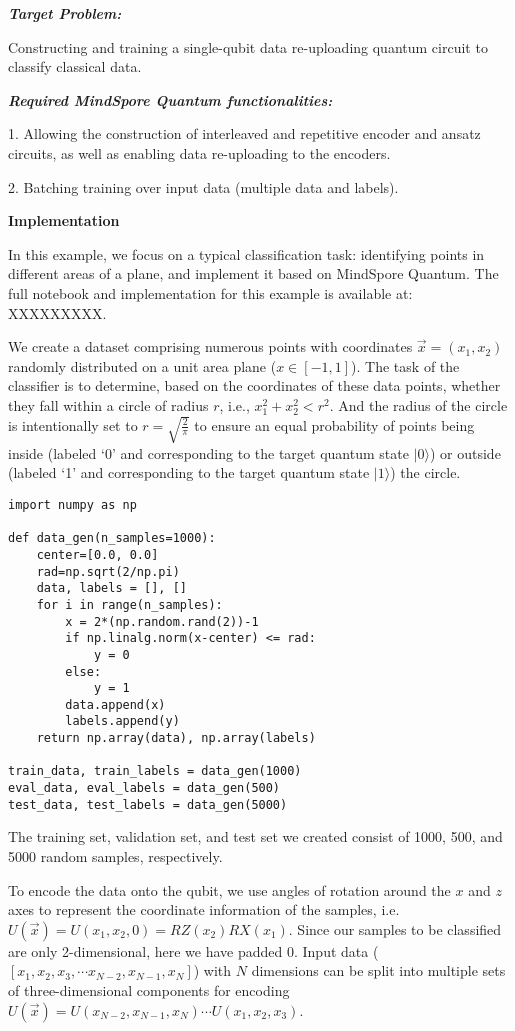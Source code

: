 \textbf{\textit{Target Problem:}}

Constructing and training a single-qubit data re-uploading quantum circuit to classify classical data.

\textbf{\textit{Required MindSpore Quantum functionalities:}}

1. Allowing the construction of interleaved and repetitive encoder and ansatz circuits, as well as enabling data re-uploading to the encoders.

2. Batching training over input data (multiple data and labels).

\textbf{Implementation}

In this example, we focus on a typical classification task: identifying points in different areas of a plane, and implement it based on MindSpore Quantum.
The full notebook and implementation for this example is available at: XXXXXXXXX.

We create a dataset comprising numerous points with coordinates $\overrightarrow{x}=(x_1, x_2)$  randomly distributed on a unit area plane ($x\in[-1,1]$).
The task of the classifier is to determine, based on the coordinates of these data points, whether they fall within a circle of radius $r$, i.e., $x_1^2+x_2^2<r^2$.
And the radius of the circle is intentionally set to $r=\sqrt{\frac{2}{\pi}}$ to ensure an equal probability of points being inside (labeled `0' and corresponding to the target quantum state $|0\rangle$) or outside (labeled `1' and corresponding to the target quantum state $|1\rangle$) the circle.

\begin{lstlisting}
import numpy as np

def data_gen(n_samples=1000):
    center=[0.0, 0.0]
    rad=np.sqrt(2/np.pi)
    data, labels = [], []
    for i in range(n_samples):
        x = 2*(np.random.rand(2))-1
        if np.linalg.norm(x-center) <= rad:
            y = 0
        else:
            y = 1
        data.append(x)
        labels.append(y)
    return np.array(data), np.array(labels)

train_data, train_labels = data_gen(1000)
eval_data, eval_labels = data_gen(500)
test_data, test_labels = data_gen(5000)
\end{lstlisting}

The training set, validation set, and test set we created consist of 1000, 500, and 5000 random samples, respectively.

To encode the data onto the qubit, we use angles of rotation around the $x$ and $z$ axes to represent the coordinate information of the samples, i.e. $U(\overrightarrow{x})=U(x_1,x_2,0)=RZ(x_2)RX(x_1)$.  Since our samples to be classified are only 2-dimensional, here we have padded 0.
Input data ($[x_1, x_2, x_3, \cdots x_{N-2}, x_{N-1},x_{N}]$) with $N$ dimensions can be split into multiple sets of three-dimensional components for encoding $U(\overrightarrow{x})=U(x_{N-2},x_{N-1},x_{N})\cdots U(x_1,x_2,x_3)$.

